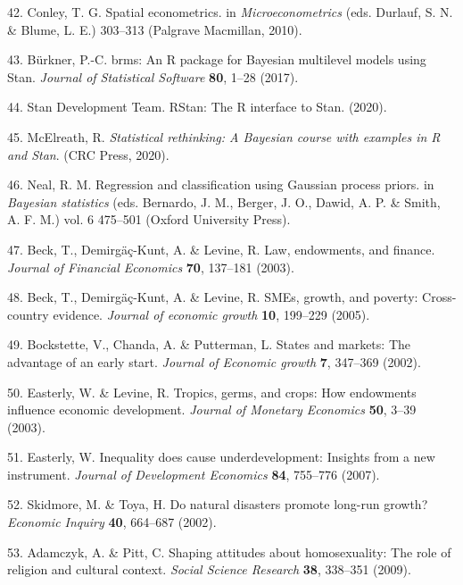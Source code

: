 \documentclass[
  english,
  man,floatsintext]{apa6}
\begin{document}
\leavevmode\hypertarget{ref-Conley2010}{}%
42. Conley, T. G. Spatial econometrics. in \emph{Microeconometrics} (eds. Durlauf, S. N. \& Blume, L. E.) 303--313 (Palgrave Macmillan, 2010).

\leavevmode\hypertarget{ref-Burkner2017}{}%
43. Bürkner, P.-C. brms: An R package for Bayesian multilevel models using Stan. \emph{Journal of Statistical Software} \textbf{80}, 1--28 (2017).

\leavevmode\hypertarget{ref-rstan}{}%
44. Stan Development Team. RStan: The R interface to Stan. (2020).

\leavevmode\hypertarget{ref-McElreath2020}{}%
45. McElreath, R. \emph{Statistical rethinking: A Bayesian course with examples in R and Stan}. (CRC Press, 2020).

\leavevmode\hypertarget{ref-Neal1998}{}%
46. Neal, R. M. Regression and classification using Gaussian process priors. in \emph{Bayesian statistics} (eds. Bernardo, J. M., Berger, J. O., Dawid, A. P. \& Smith, A. F. M.) vol. 6 475--501 (Oxford University Press).

\leavevmode\hypertarget{ref-Beck2003}{}%
47. Beck, T., Demirgäç-Kunt, A. \& Levine, R. Law, endowments, and finance. \emph{Journal of Financial Economics} \textbf{70}, 137--181 (2003).

\leavevmode\hypertarget{ref-Beck2005}{}%
48. Beck, T., Demirgäç-Kunt, A. \& Levine, R. SMEs, growth, and poverty: Cross-country evidence. \emph{Journal of economic growth} \textbf{10}, 199--229 (2005).

\leavevmode\hypertarget{ref-Bockstette2002}{}%
49. Bockstette, V., Chanda, A. \& Putterman, L. States and markets: The advantage of an early start. \emph{Journal of Economic growth} \textbf{7}, 347--369 (2002).

\leavevmode\hypertarget{ref-Easterly2003}{}%
50. Easterly, W. \& Levine, R. Tropics, germs, and crops: How endowments influence economic development. \emph{Journal of Monetary Economics} \textbf{50}, 3--39 (2003).

\leavevmode\hypertarget{ref-Easterly2007}{}%
51. Easterly, W. Inequality does cause underdevelopment: Insights from a new instrument. \emph{Journal of Development Economics} \textbf{84}, 755--776 (2007).

\leavevmode\hypertarget{ref-Skidmore2002}{}%
52. Skidmore, M. \& Toya, H. Do natural disasters promote long-run growth? \emph{Economic Inquiry} \textbf{40}, 664--687 (2002).

\leavevmode\hypertarget{ref-Adamczyk2009}{}%
53. Adamczyk, A. \& Pitt, C. Shaping attitudes about homosexuality: The role of religion and cultural context. \emph{Social Science Research} \textbf{38}, 338--351 (2009).
\end{document}
